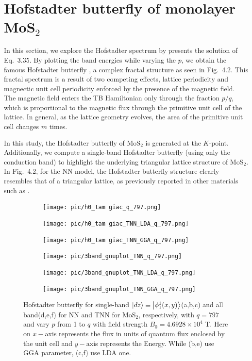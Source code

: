 \section{Hofstadter butterfly of monolayer MoS$_{2}$}
In this section, we explore the Hofstadter spectrum by presents the solution of Eq.~3.35. By plotting the band energies while varying the $p$, we obtain the famous Hofstadter butterfly \cite{PhysRevB.14.2239}, a complex fractal structure as seen in Fig.~4.2. This fractal spectrum is a result of two competing effects, lattice periodicity and magnectic unit cell periodicity enforced by the presence of the magnetic field. The magnetic field enters the \ac{TB} Hamiltonian only through the fraction $p/q$, which is proportional to the magnetic flux through the primitive unit cell of the lattice. In general, as the lattice geometry evolves, the area of the primitive unit cell changes $m$ times.

In this study, the Hofstadter butterfly of MoS$_2$ is generated at the $K$-point. Additionally, we compute a single-band Hofstadter butterfly (using only the conduction band) to highlight the underlying triangular lattice structure of MoS$_2$. In Fig.~4.2, for the \ac{NN} model, the Hofstadter butterfly structure clearly resembles that of a triangular lattice, as previously reported in other materials such as \cite{li2011}.


\begin{figure}[htb]
\centering
\begin{subfigure}[b]{0.32\textwidth}
	\centering
	\texttt{[image: pic/h0\_tam giac\_q\_797.png]}
	\label{fig:3 band}
\end{subfigure}
\begin{subfigure}[b]{0.32\textwidth}
	\centering
	\texttt{[image: pic/h0\_tam giac\_TNN\_LDA\_q\_797.png]}
	\label{}
\end{subfigure}
\begin{subfigure}[b]{0.32\textwidth}
	\centering
	\texttt{[image: pic/h0\_tam giac\_TNN\_GGA\_q\_797.png]}
	\label{}
\end{subfigure}
\begin{subfigure}[b]{0.32\textwidth}
	\centering
	\texttt{[image: pic/3band\_gnuplot\_TNN\_q\_797.png]}
	\label{fig:1 band}
\end{subfigure}
\begin{subfigure}[b]{0.32\textwidth}
	\centering
	\texttt{[image: pic/3band\_gnuplot\_TNN\_LDA\_q\_797.png]}
	\label{}
\end{subfigure}
\begin{subfigure}[b]{0.32\textwidth}
	\centering
	\texttt{[image: pic/3band\_gnuplot\_TNN\_GGA\_q\_797.png]}
	\label{}
\end{subfigure}
\caption[Hofstadter butterfly for {TMD}.]{
	Hofstadter butterfly for single-band $\ket{dz} \equiv \ket{\phi_{1}^{1}(x,y)}$(a,b,c) and all band(d,e,f) for \ac{NN} and \ac{TNN} for MoS$_2$, respectively, with $q = 797$ and vary $p$ from 1 to $q$ with field strength $B_{0} = 4.6928 \times 10^{4}$ T. Here on $x-$axis represents the flux in units of quantum flux enclosed by the unit cell and $y-$axis represents the Energy. While (b,e) use \ac{GGA} parameter, (c,f) use \ac{LDA} one.
}
\end{figure}

